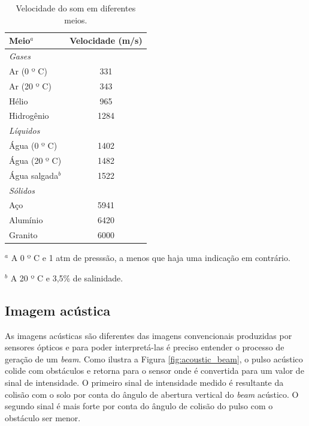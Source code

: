 \begin{table}[H]
    \centering
    \begin{threeparttable}
    \caption{Velocidade do som em diferentes meios.}
    \label{tab:vel_som}
    \begin{tabular}{lc}
        \toprule
            \textbf{Meio$^a$} & \textbf{Velocidade (m/s)} \\ 
        \midrule
            \textit{Gases} &  \\
            Ar (0 º C) & 331 \\
            Ar (20 º C) & 343 \\
            Hélio & 965 \\
            Hidrogênio & 1284 \\
            \textit{Líquidos} &  \\
            Água (0 º C) & 1402 \\
            Água (20 º C) & 1482 \\
            Água salgada$^b$ & 1522 \\
            \textit{Sólidos} &  \\
            Aço & 5941 \\
            Alumínio & 6420 \\
            Granito & 6000 \\ \bottomrule
    \end{tabular}
    \begin{tablenotes}
        \item $^a$ A 0 º C e 1 atm de presssão, a menos que haja uma indicação em contrário.
        \item $^b$ A 20 º C e 3,5\% de salinidade.
    \end{tablenotes}
    \end{threeparttable}
\end{table}

\subsection{Imagem acústica}
\label{sec:imagem_acustica}

As imagens acústicas são diferentes das imagens convencionais produzidas por sensores ópticos e para poder interpretá-las é preciso entender o processo de geração de um \textit{beam}. 
Como ilustra a Figura \ref{fig:acoustic_beam}, o pulso acústico colide com obstáculos e retorna para o sensor onde é convertida para um valor de sinal de intensidade. 
O primeiro sinal de intensidade medido é resultante da colisão com o solo por conta do ângulo de abertura vertical do \textit{beam} acústico.
O segundo sinal é mais forte por conta do ângulo de colisão do pulso com o obstáculo ser menor.

